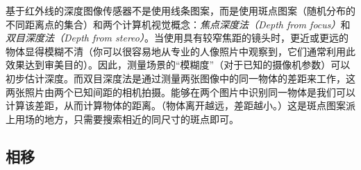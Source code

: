 
基于红外线的深度图像传感器不是使用线条图案，而是使用斑点图案（随机分布的不同距离点的集合）和两个计算机视觉概念：\emph{焦点深度法（Depth from focus）}和\emph{双目深度法（Depth from stereo）}。当使用具有较窄焦距的镜头时，更近或更远的物体显得模糊不清（你可以很容易地从专业的人像照片中观察到，它们通常利用此效果达到审美目的）。因此，测量场景的“模糊度”（对于已知的摄像机参数）可以初步估计深度。而双目深度法是通过测量两张图像中的同一物体的差距来工作，这两张照片由两个已知间距的相机拍摄。能够在两个图片中识别同一物体是我们可以计算该差距，从而计算物体的距离。（物体离开越远，差距越小。）这是斑点图案派上用场的地方，只需要搜索相近的同尺寸的斑点即可。


\subsection{相移}
\label{sec:phaseshiftsensors}


